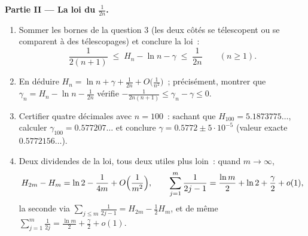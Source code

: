 \begin{problem}[{Devoir maison --- $H_n = \ln n + \gamma +
\frac{1}{2n} + O(n^{-2})$, et le réarrangement de $1 - \frac12 +
\frac13 - \dots$ en $\frac{\ln 2}{2}$}]
\medskip
\noindent\textbf{Partie II --- La loi du $\frac{1}{2n}$.}
\begin{enumerate}[resume]
  \item Sommer les bornes de la question 3 (les deux côtés se
        télescopent ou se comparent à des télescopages) et conclure
        la loi~:
        \[
        \frac{1}{2(n+1)} \;\leq\; H_n - \ln n - \gamma \;\leq\;
        \frac{1}{2n} \qquad (n \geq 1).
        \]
  \item En déduire $H_n = \ln n + \gamma + \frac{1}{2n} +
        O\bigl(\frac{1}{n^2}\bigr)$~; précisément, montrer que
        $\gamma_n = H_n - \ln n - \frac{1}{2n}$ vérifie
        $-\frac{1}{2n(n+1)} \leq \gamma_n - \gamma \leq 0$.
  \item Certifier quatre décimales avec $n = 100$~: sachant que
        $H_{100} = 5.1873775\dots$, calculer $\gamma_{100} =
        0.577207\dots$ et conclure $\gamma = 0.5772 \pm 5\cdot10^{-5}$
        (valeur exacte $0.5772156\dots$).
  \item Deux dividendes de la loi, tous deux utiles plus loin~: quand
        $m \to \infty$,
        \[
        H_{2m} - H_m = \ln 2 - \frac{1}{4m} +
        O\Bigl(\frac{1}{m^2}\Bigr),
        \qquad
        \sum_{j=1}^{m} \frac{1}{2j-1} = \frac{\ln m}{2} + \ln 2
        + \frac\gamma2 + o(1) ,
        \]
        la seconde via $\sum_{j \leq m} \frac{1}{2j-1} = H_{2m}
        - \frac12 H_m$, et de même $\sum_{j=1}^{m}
        \frac{1}{2j} = \frac{\ln m}{2} + \frac\gamma2 + o(1)$.
\end{enumerate}


\end{problem}
